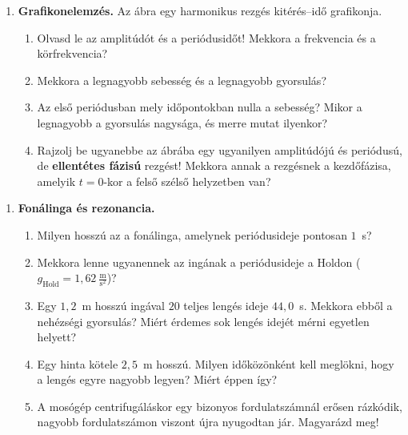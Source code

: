\documentclass[12pt]{article}
\begin{document}
\begin{minipage}[t]{0.58\linewidth}\vspace{0pt}
\begin{enumerate}[start=2]
\item \textbf{Grafikonelemzés.} Az ábra egy harmonikus rezgés kitérés--idő grafikonja.
  \begin{enumerate}
    \item Olvasd le az amplitúdót és a periódusidőt! Mekkora a frekvencia és a
      körfrekvencia?
    \item Mekkora a legnagyobb sebesség és a legnagyobb gyorsulás?
    \item Az első periódusban mely időpontokban nulla a sebesség? Mikor a legnagyobb a
      gyorsulás nagysága, és merre mutat ilyenkor?
    \item Rajzolj be ugyanebbe az ábrába egy ugyanilyen amplitúdójú és periódusú, de
      \textbf{ellentétes fázisú} rezgést! Mekkora annak a rezgésnek a kezdőfázisa, amelyik
      $t = 0$-kor a felső szélső helyzetben van?
  \end{enumerate}
\end{enumerate}
\end{minipage}\hfill
\begin{minipage}[t]{0.39\linewidth}\vspace{0pt}\centering
{}
\end{minipage}

\newpage
\begin{enumerate}[start=3]
\item \textbf{Fonálinga és rezonancia.}
  \begin{enumerate}
    \item Milyen hosszú az a fonálinga, amelynek periódusideje pontosan $1$~s?
    \item Mekkora lenne ugyanennek az ingának a periódusideje a Holdon
      ($g_\text{Hold} = 1{,}62~\tfrac{\text{m}}{\text{s}^2}$)?
    \item Egy $1{,}2$~m hosszú ingával $20$ teljes lengés ideje $44{,}0$~s. Mekkora ebből a
      nehézségi gyorsulás? Miért érdemes sok lengés idejét mérni egyetlen helyett?
    \item Egy hinta kötele $2{,}5$~m hosszú. Milyen időközönként kell meglökni, hogy a lengés
      egyre nagyobb legyen? Miért éppen így?
    \item A mosógép centrifugáláskor egy bizonyos fordulatszámnál erősen rázkódik, nagyobb
      fordulatszámon viszont újra nyugodtan jár. Magyarázd meg!
  \end{enumerate}
\end{enumerate}
\end{document}
